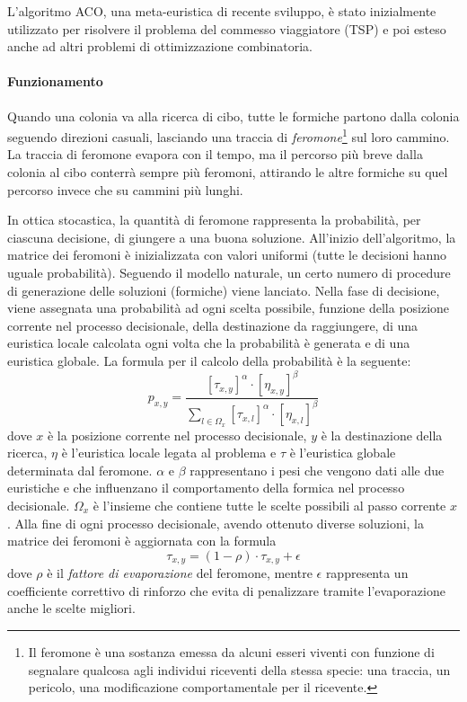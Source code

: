 L'algoritmo \ac{ACO}, una meta-euristica di recente sviluppo, è stato inizialmente 
utilizzato per risolvere il problema del commesso viaggiatore (\acs{TSP}) 
\cite{AntSystem} e poi esteso anche ad altri problemi di ottimizzazione 
combinatoria.

\paragraph{Funzionamento}
Quando una colonia va alla ricerca di cibo, tutte le formiche partono dalla 
colonia seguendo direzioni casuali, lasciando una traccia di 
\emph{feromone}\footnote{Il feromone è una sostanza emessa da alcuni esseri 
viventi con funzione di segnalare qualcosa agli individui riceventi 
della stessa specie: una traccia, un pericolo, una modificazione 
comportamentale per il ricevente.} sul loro cammino. La traccia di feromone 
evapora con il tempo, ma il percorso più breve dalla colonia al cibo conterrà 
sempre più feromoni, attirando le altre formiche su quel percorso invece che su 
cammini più lunghi.

In ottica stocastica, la quantità di feromone rappresenta la probabilità, per 
ciascuna decisione, di giungere a una buona soluzione. All'inizio 
dell'algoritmo, la matrice dei feromoni è inizializzata con valori uniformi 
(tutte le decisioni hanno uguale probabilità). Seguendo il modello naturale, un 
certo numero di procedure di generazione delle soluzioni (formiche) viene 
lanciato. Nella fase di decisione, viene assegnata una probabilità ad ogni 
scelta possibile, funzione della posizione corrente nel processo decisionale, 
della destinazione da raggiungere, di una euristica locale calcolata ogni volta 
che la probabilità è generata e di una euristica globale. La formula per il 
calcolo della probabilità è la seguente:
\begin{equation}
 p_{x,y} = \frac{[\tau_{x,y}]^{\alpha}\cdot[\eta_{x,y}]^{\beta}}{\sum_{l \in 
\Omega_{x}}[\tau_{x,l}]^{\alpha}\cdot[\eta_{x,l}]^{\beta}}
\end{equation}
dove $x$ è la posizione corrente nel processo decisionale, $y$ è la 
destinazione della ricerca, $\eta$ è l'euristica locale legata al problema e 
$\tau$ è l'euristica globale determinata dal feromone. $\alpha$ e $\beta$ 
rappresentano i pesi che vengono dati alle due euristiche e che influenzano il 
comportamento della formica nel processo decisionale. $\Omega_x$ è l'insieme che 
contiene tutte le scelte possibili al passo corrente $x$. Alla fine di ogni 
processo decisionale, avendo ottenuto diverse soluzioni, la matrice dei 
feromoni è aggiornata con la formula
\begin{equation}
 \tau_{x,y} = (1-\rho)\cdot \tau_{x,y} + \epsilon
\end{equation}
dove $\rho$ è il \emph{fattore di evaporazione} del feromone, mentre $\epsilon$ 
rappresenta un coefficiente correttivo di rinforzo che evita di penalizzare 
tramite l'evaporazione anche le scelte migliori.



